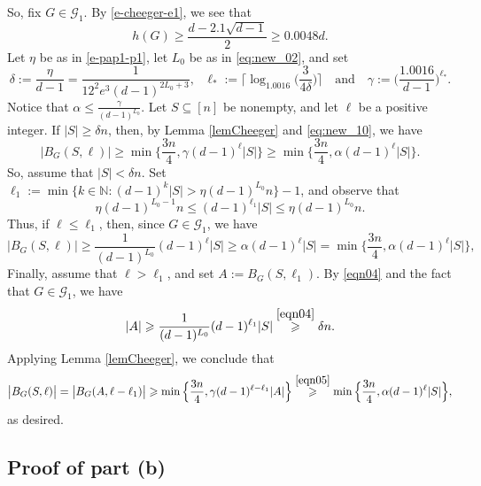 \documentclass[11pt,leqno]{amsart}
\theoremstyle{remark}
\theoremstyle{plain}
\begin{document}
So, fix $G\in\mathcal{G}_1$. By \eqref{e-cheeger-e1}, we see that
\begin{equation}\label{eq:new_10}
h(G)\geqslant \frac{d-2.1\sqrt{d-1}}{2}\geqslant 0.0048 d.
\end{equation}
Let $\eta$ be as in \eqref{e-pap1-p1}, let $L_0$ be as in \eqref{eq:new_02}, and set
\[ \delta := \frac{\eta}{d-1}=\frac{1}{12^{2} e^{3} (d-1)^{2L_0+3}}, \ \ \
\ell_* := \Big\lceil \log_{1.0016}\Big(\frac{3}{4\delta}\Big)\Big\rceil \ \ \ \text{ and } \ \ \
\gamma :=\Big(\frac{1.0016}{d-1}\Big)^{\ell_*}. \]
Notice that $\alpha \leqslant \frac{\gamma}{(d-1)^{L_0}}$. Let $S\subseteq [n]$ be nonempty, and let $\ell$ be a positive integer.
If $|S|\geqslant\delta n$, then, by Lemma \ref{lemCheeger} and \eqref{eq:new_10}, we have
\[ \big|B_{G}(S,\ell)\big| \geqslant
\min\Big\{\frac{3n}{4},\gamma (d-1)^\ell|S|\Big\} \geqslant \min\Big\{\frac{3n}{4},\alpha (d-1)^\ell|S|\Big\}.\]
So, assume that $|S|<\delta n$. Set $\ell_1:= \min\big\{k\in\mathbb{N}\colon (d-1)^k|S|> \eta(d-1)^{L_0} n\big\}-1$,
and observe that
\begin{equation} \label{eqn04}
 \eta(d-1)^{L_0-1}n \leqslant (d-1)^{\ell_1}|S| \leqslant \eta(d-1)^{L_0} n.
\end{equation}
Thus, if $\ell\leqslant \ell_1$, then, since $G\in\mathcal{G}_1$, we have
\[ \big| B_{G}(S,\ell)\big| \geqslant \frac{1}{(d-1)^{L_0}} (d-1)^\ell |S|
\geqslant \alpha (d-1)^\ell |S|
= \min\Big\{\frac{3n}{4},\alpha (d-1)^\ell |S|\Big\},\]
Finally, assume that $\ell>\ell_1$, and set $A:=B_{G}(S,\ell_1)$. By \eqref{eqn04} and the fact that
$G\in\mathcal{G}_1$, we have
\begin{equation}\label{eqn05}
  |A|\geqslant \frac{1}{(d-1)^{L_0}} (d-1)^{\ell_1}|S|\stackrel{\eqref{eqn04}}{\geqslant}\delta n.
\end{equation}
Applying Lemma \ref{lemCheeger}, we conclude that
\[ \big|B_{G}(S,\ell)\big| = \big|B_{G}(A,\ell-\ell_1)\big|
\geqslant \min\Big\{\frac{3n}{4},\gamma (d-1)^{\ell-\ell_1}|A|\Big\}
\stackrel{\eqref{eqn05}}{\geqslant}
\min\Big\{\frac{3n}{4},\alpha (d-1)^\ell|S|\Big\}, \]
as desired.

\subsection{Proof of part (b)}
\end{document}
